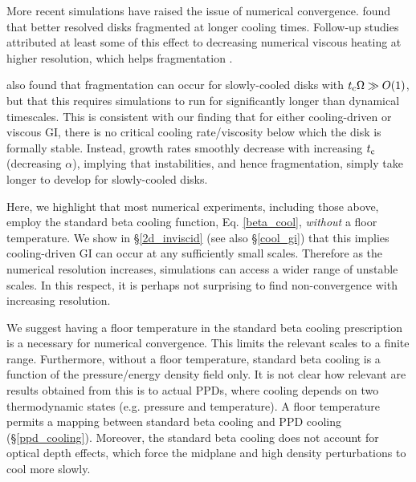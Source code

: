 More recent simulations have raised the issue of numerical
convergence. %
\cite{meru11} found that better resolved disks fragmented at longer cooling times.
Follow-up studies attributed at least some of this effect to decreasing numerical viscous
heating at higher resolution, which helps fragmentation
\citep{lodato11,meru12}.

 \cite{paardekooper12} also found that fragmentation can occur 
for  slowly-cooled disks with $t_\mathrm{c}\Omega\gg O(1)$, but that this requires   
simulations to run for significantly longer than dynamical 
timescales. This is consistent with our finding
that for either cooling-driven or viscous GI, there is no critical 
cooling rate/viscosity below  which the disk is  
formally stable. Instead, growth rates smoothly decrease with
increasing $t_\mathrm{c}$ (decreasing $\alpha$), implying that
instabilities, and hence fragmentation, simply take longer to develop
for slowly-cooled disks.         


Here, we highlight that most numerical experiments, including those
above, employ the standard beta cooling function, Eq. \ref{beta_cool},
\emph{without} a floor temperature. We show in \S\ref{2d_inviscid}
(see also \S\ref{cool_gi}) that this implies cooling-driven GI can
occur at any sufficiently small scales. Therefore as the numerical
resolution increases, simulations can access a wider range of unstable
scales.  %
In this respect, it is perhaps not surprising to find non-convergence with 
increasing resolution. %

We suggest having a floor temperature in the standard beta
cooling prescription is a necessary for  
numerical convergence. This limits the
relevant scales to a finite range.  %
Furthermore, without a floor temperature, standard beta cooling is
a function of the pressure/energy density field only. It is not clear
how relevant are results obtained from this is to actual PPDs,
where cooling depends on two thermodynamic states (e.g. pressure and
temperature). A floor temperature permits a mapping between standard beta
cooling and PPD cooling (\S\ref{ppd_cooling}). 
Moreover, the standard beta cooling does 
not account for optical depth effects, which force the midplane 
and high density perturbations to cool more slowly.

